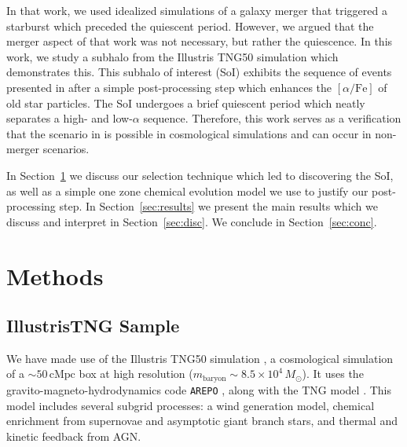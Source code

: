 \documentclass[linenumbers, twocolumn]{aastex631}
\newcommand{\Msun}{\ensuremath{M_{\odot}}}
\newcommand{\alphaFe}{\ensuremath{[\alpha/\textrm{Fe}]}}
\begin{document}
In that work, we used idealized simulations of a galaxy merger that triggered a starburst which preceded the quiescent period. However, we argued that the merger aspect of that work was not necessary, but rather the quiescence. In this work, we study a subhalo from the Illustris TNG50 simulation which demonstrates this. This subhalo of interest (SoI) exhibits the sequence of events presented in \citet{2024arXiv240707985B} after a simple post-processing step which enhances the \alphaFe{} of old star particles. The SoI undergoes a brief quiescent period which neatly separates a high- and low-$\alpha$ sequence. Therefore, this work serves as a verification that the scenario in \citet{2024arXiv240707985B} is possible in cosmological simulations and can occur in non-merger scenarios.

In Section~\ref{sec:methods} we discuss our selection technique which led to discovering the SoI, as well as a simple one zone chemical evolution model we use to justify our post-processing step. In Section~\ref{sec:results} we present the main results which we discuss and interpret in Section~\ref{sec:disc}. We conclude in Section~\ref{sec:conc}.


\section{Methods}\label{sec:methods}
\subsection{IllustrisTNG Sample}\label{ssec:tng}
We have made use of the Illustris TNG50 simulation \citep{2019MNRAS.490.3196P, 2019MNRAS.490.3234N}, a cosmological simulation of a $\sim50\,\textrm{cMpc}$ box at high resolution ($m_{\textrm{baryon}}\sim8.5\times10^4\,\Msun$). It uses the gravito-magneto-hydrodynamics code \texttt{AREPO} \citep{2010MNRAS.401..791S, 2016MNRAS.455.1134P}, along with the TNG model \citep{2013MNRAS.436.3031V, 2017MNRAS.465.3291W, 2018MNRAS.473.4077P}. This model includes several subgrid processes: a wind generation model, chemical enrichment from supernovae and asymptotic giant branch stars, and thermal and kinetic feedback from AGN.
\end{document}
